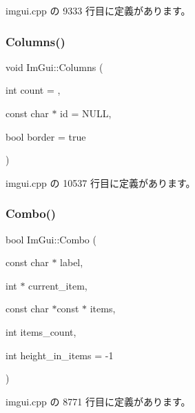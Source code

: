  imgui.\+cpp の 9333 行目に定義があります。

\mbox{\label{namespace_im_gui_a0e2889956542527c4039b6b8bf5c2a38}} 
\subsubsection{\texorpdfstring{Columns()}{Columns()}}
{\footnotesize\ttfamily void Im\+Gui\+::\+Columns (\begin{DoxyParamCaption}\item[{int}]{count = {},  }\item[{const char $\ast$}]{id = {\ttfamily NULL},  }\item[{bool}]{border = {\ttfamily true} }\end{DoxyParamCaption})}



 imgui.\+cpp の 10537 行目に定義があります。

\mbox{\label{namespace_im_gui_ae801624ec02dac3b2b03321fffd91f1a}} 
\subsubsection{\texorpdfstring{Combo()}{Combo()}\hspace{0.1cm}{\footnotesize\ttfamily [1/3]}}
{\footnotesize\ttfamily bool Im\+Gui\+::\+Combo (\begin{DoxyParamCaption}\item[{const char $\ast$}]{label,  }\item[{int $\ast$}]{current\+\_\+item,  }\item[{const char $\ast$const $\ast$}]{items,  }\item[{int}]{items\+\_\+count,  }\item[{int}]{height\+\_\+in\+\_\+items = {\ttfamily -\/1} }\end{DoxyParamCaption})}



 imgui.\+cpp の 8771 行目に定義があります。

\mbox{\label{namespace_im_gui_ae80520312b19a7039b77d2bafcbda8e5}} 
